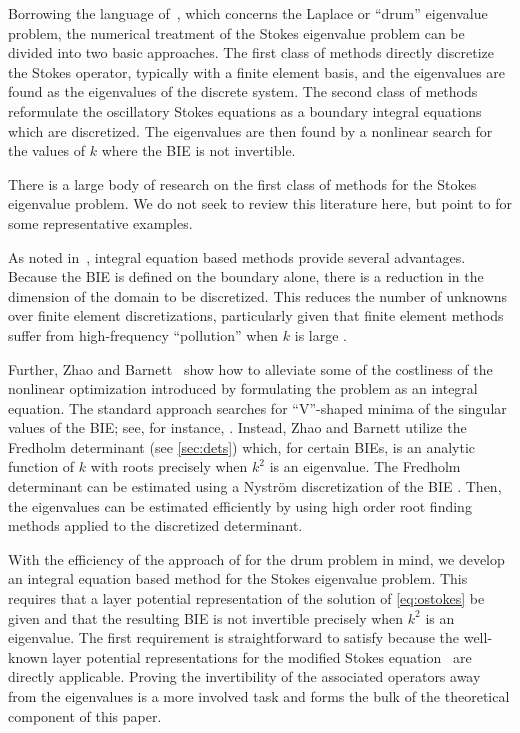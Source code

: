 Borrowing the language of~\cite{zhao2015robust},
which concerns the Laplace or ``drum'' eigenvalue
problem,
the numerical treatment of the Stokes eigenvalue
problem can be divided into two basic approaches.
%
The first class of methods
directly discretize the
Stokes operator, typically with a
finite element basis, and the eigenvalues are found
as the eigenvalues of the discrete system.
%
The second class of methods reformulate the 
oscillatory Stokes equations as a boundary integral
equations which are discretized.
The eigenvalues are then found
by a nonlinear search for the values of $k$ where the BIE 
is not invertible.
%

There is a large body of research on the first class of methods
for the Stokes eigenvalue problem.
%
We do not seek to review this literature here,
but point to \cite{johnson1974beam,
  rannacher1979nonconforming,
  mercier1981eigenvalue,bjorstad1999high,
  jia2009approximation,chen2006approximation,
  lovadina2009posteriori,huang2011numerical,
  carstensen2014guaranteed}
for some representative examples.


As noted in~\cite{zhao2015robust}, integral equation based
methods provide several advantages.
%
Because the BIE is defined on the
boundary alone, there is a reduction in the
dimension of the domain to be discretized.
%
This reduces the number of unknowns over finite
element discretizations, particularly given
that finite element methods suffer from
high-frequency ``pollution'' when $k$ is large
\cite{babuska1997pollution}.

Further, Zhao and Barnett~\cite{zhao2015robust}
show how to alleviate some of the costliness of the
nonlinear optimization introduced by formulating the 
problem as an integral equation.
%
The standard approach searches for ``V''-shaped minima
of the singular values of the BIE; see, for
instance, \cite{trefethen2006computed}.
%
Instead, Zhao and Barnett utilize the Fredholm
determinant (see \cref{sec:dets}) which, for certain
BIEs, is an analytic function of $k$ with roots
precisely when $k^2$ is an eigenvalue.
%
The Fredholm determinant can be estimated using
a Nystr\"{o}m discretization of the BIE
\cite{bornemann2010numerical,zhao2015robust}.
%
Then, the eigenvalues can be estimated efficiently
by using high order root finding methods applied
to the discretized determinant.

With the efficiency of the approach of
\cite{zhao2015robust} for the drum problem in mind,
we develop an integral equation based method for the Stokes eigenvalue
problem.
%
This requires that a layer
potential representation of the solution
of \cref{eq:ostokes} be given and that the resulting BIE
is not invertible precisely when $k^2$ is an eigenvalue.
%
The first requirement is straightforward to
satisfy because the
well-known layer potential representations for the
modified Stokes equation~\cite{Pozrikidis1992,biros2002embedded,
  jiang2013second,ladyzhenskaya1969mathematical}
are directly applicable.
%
Proving the invertibility of the associated operators
away from the eigenvalues is a more involved task
and forms the bulk of the theoretical component
of this paper.

